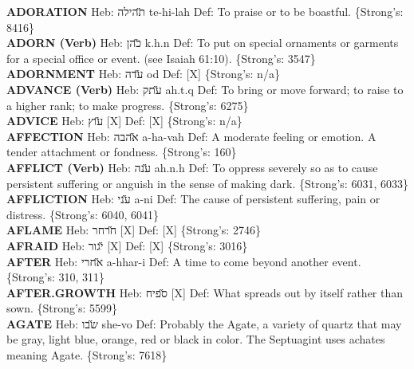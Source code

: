 {\textbf{ADORATION} Heb: {\large\H תהילה} te-hi-lah Def: To praise or to be boastful. \{Strong's: 8416\}\hfill{}\\

\textbf{ADORN (Verb)} Heb: {\large\H כהן} k.h.n Def: To put on special ornaments or garments for a special office or event. (see Isaiah 61:10). \{Strong's: 3547\}\hfill{}\\

\textbf{ADORNMENT} Heb: {\large\H עדה} od Def: {[}X{]} \{Strong's: n/a\}\hfill{}\\

\textbf{ADVANCE (Verb)} Heb: {\large\H עתק} ah.t.q Def: To bring or move forward; to raise to a higher rank; to make progress. \{Strong's: 6275\}\hfill{}\\

\textbf{ADVICE} Heb: {\large\H עוץ} {[}X{]} Def: {[}X{]} \{Strong's: n/a\}\hfill{}\\

\textbf{AFFECTION} Heb: {\large\H אהבה} a-ha-vah Def: A moderate feeling or emotion. A tender attachment or fondness. \{Strong's: 160\}\hfill{}\\

\textbf{AFFLICT (Verb)} Heb: {\large\H ענה} ah.n.h Def: To oppress severely so as to cause persistent suffering or anguish in the sense of making dark. \{Strong's: 6031, 6033\}\hfill{}\\

\textbf{AFFLICTION} Heb: {\large\H עני} a-ni Def: The cause of persistent suffering, pain or distress. \{Strong's: 6040, 6041\}\hfill{}\\

\textbf{AFLAME} Heb: {\large\H חרחר} {[}X{]} Def: {[}X{]} \{Strong's: 2746\}\hfill{}\\

\textbf{AFRAID} Heb: {\large\H יגור} {[}X{]} Def: {[}X{]} \{Strong's: 3016\}\hfill{}\\

\textbf{AFTER} Heb: {\large\H אחרי} a-hhar-i Def: A time to come beyond another event. \{Strong's: 310, 311\}\hfill{}\\

\textbf{AFTER.GROWTH} Heb: {\large\H ספיח} {[}X{]} Def: What spreads out by itself rather than sown. \{Strong's: 5599\}\hfill{}\\

\textbf{AGATE} Heb: {\large\H שבו} she-vo Def: Probably the Agate, a variety of quartz that may be gray, light blue, orange, red or black in color. The Septuagint uses achates meaning Agate. \{Strong's: 7618\}\hfill{}\\

}
